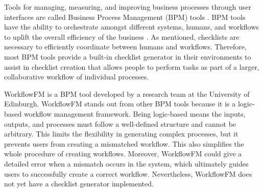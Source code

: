 Tools for managing, measuring, and improving business processes through user interfaces are called Business Process Management (BPM) tools \cite{bpmbenefits, whatisbpm}. BPM tools have the ability to orchestrate amongst different systems, humans, and workflows to uplift the overall efficiency of the business \cite{bpmstrength}. As mentioned, checklists are necessary to efficiently coordinate between humans and workflows. Therefore, most BPM tools provide a built-in checklist generator in their environments to assist in checklist creation that allows people to perform tasks as part of a larger, collaborative workflow of individual processes.


WorkflowFM \cite{papapanagiotou2017workflowfm} is a BPM tool developed by a research team at the University of Edinburgh.
WorkflowFM stands out from other BPM tools because it is a logic-based workflow management framework.
Being logic-based means the inputs, outputs, and processes must follow a well-defined structure and cannot be arbitrary. This limits the flexibility in generating complex processes, but it prevents users from creating a mismatched workflow. This also simplifies the whole procedure of creating workflows.
Moreover, WorkflowFM could give a detailed error when a mismatch occurs in the system, which ultimately guides users to successfully create a correct workflow.
Nevertheless, WorkflowFM does not yet have a checklist generator implemented.

